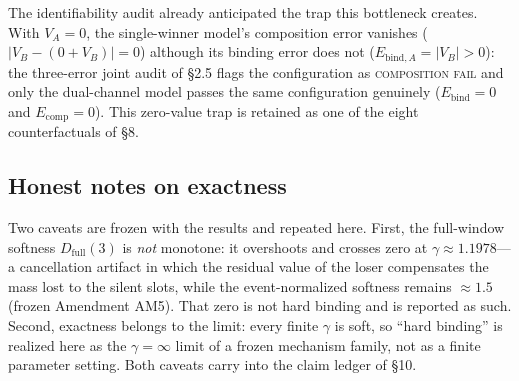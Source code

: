 The identifiability audit already anticipated the trap this bottleneck
creates. With $V_A=0$, the single-winner model's composition error
vanishes ($|V_B-(0+V_B)|=0$) although its binding error does not
($E_{\mathrm{bind},A}=|V_B|>0$): the three-error joint audit of §2.5 flags
the configuration as \textsc{composition fail} and only the dual-channel
model passes the same configuration genuinely ($E_{\mathrm{bind}}=0$ and
$E_{\mathrm{comp}}=0$). This zero-value trap is retained as one of the
eight counterfactuals of §8.

\subsection{Honest notes on exactness}
\label{sec:notes7}

Two caveats are frozen with the results and repeated here. First, the
full-window softness $D_{\mathrm{full}}(3)$ is \emph{not} monotone: it
overshoots and crosses zero at $\gamma\approx1.1978$---a cancellation
artifact in which the residual value of the loser compensates the mass
lost to the silent slots, while the event-normalized softness remains
$\approx1.5$ (frozen Amendment AM5). That zero is not hard binding and is
reported as such. Second, exactness belongs to the limit: every finite
$\gamma$ is soft, so ``hard binding'' is realized here as the
$\gamma=\infty$ limit of a frozen mechanism family, not as a finite
parameter setting. Both caveats carry into the claim ledger of §10.
